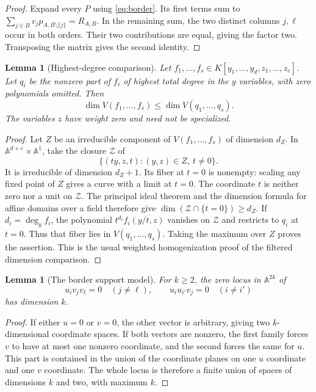\documentclass[11pt]{article}
\newtheorem{lemma}[theorem]{Lemma}
\theoremstyle{remark}
\newcommand{\A}{\mathbb A}
\newcommand{\kk}{K}
\newcommand{\smallset}[2]{#1\setminus\{#2\}}
\numberwithin{equation}{section}
\begin{document}
\begin{proof}
Expand every $P$ using \eqref{eq:border}. Its first terms sum to
$\sum_{j\in B}v_jp_{A,\smallset B j}=R_{A,B}$.
In the remaining sum, the two distinct columns $j,\ell$ occur in both
orders. Their two contributions are equal, giving the factor two.
Transposing the matrix gives the second identity.
\end{proof}

\begin{lemma}[Highest-degree comparison]\label{lem:dimension}
Let $f_1,\ldots,f_s\in\kk[y_1,\ldots,y_d,z_1,\ldots,z_e]$.
Let $q_i$ be the nonzero part of $f_i$ of highest total degree in the
$y$ variables, with zero polynomials omitted. Then
\[
 \dim V(f_1,\ldots,f_s)\leq\dim V(q_1,\ldots,q_s).
\]
The variables $z$ have weight zero and need not be specialized.
\end{lemma}

\begin{proof}
Let $Z$ be an irreducible component of $V(f_1,\ldots,f_s)$ of
dimension $d_Z$. In $\A^{d+e}\times\A^1$, take the closure $\mathcal Z$
of
\[
 \{(t y,z,t):(y,z)\in Z,\ t\neq0\}.
\]
It is irreducible of dimension $d_Z+1$. Its fiber at $t=0$ is nonempty:
scaling any fixed point of $Z$ gives a curve with a limit at $t=0$.
The coordinate $t$ is neither zero nor a unit on $\mathcal Z$.
The principal ideal theorem and the dimension formula for affine
domains over a field therefore give
$\dim(\mathcal Z\cap\{t=0\})\geq d_Z$.
If $d_i=\deg_y f_i$, the polynomial
$t^{d_i}f_i(y/t,z)$ vanishes on $\mathcal Z$ and restricts to $q_i$
at $t=0$. Thus that fiber lies in $V(q_1,\ldots,q_s)$.
Taking the maximum over $Z$ proves the assertion. This is the usual
weighted homogenization proof of the filtered dimension comparison.
\end{proof}

\begin{lemma}[The border support model]\label{lem:support}
For $k\geq2$, the zero locus in $\A^{2k}$ of
\begin{equation}\label{eq:support}
 u_i v_jv_\ell=0\quad(j\neq\ell),\qquad
 u_i u_{i'}v_j=0\quad(i\neq i')
\end{equation}
has dimension $k$.
\end{lemma}

\begin{proof}
If either $u=0$ or $v=0$, the other vector is arbitrary, giving two
$k$-dimensional coordinate spaces. If both vectors are nonzero, the
first family forces $v$ to have at most one nonzero coordinate, and
the second forces the same for $u$. This part is contained in the
union of the coordinate planes on one $u$ coordinate and one $v$
coordinate. The whole locus is therefore a finite union of spaces
of dimensions $k$ and two, with maximum $k$.
\end{proof}
\end{document}

